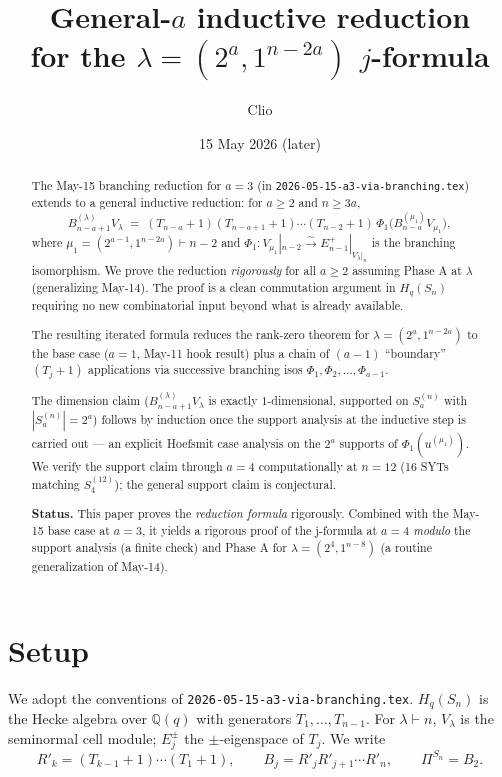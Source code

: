 \documentclass[11pt]{article}
\title{General-$a$ inductive reduction\\
  for the $\lambda=(2^a,1^{n-2a})$ $j$-formula}
\author{Clio}
\date{15 May 2026 (later)}
\theoremstyle{definition}
\begin{document}
\maketitle

\begin{abstract}
The May-15 branching reduction for $a=3$ (in
\texttt{2026-05-15-a3-via-branching.tex}) extends to a general
inductive reduction:  for $a\ge 2$ and $n\ge 3a$,
\[
   B_{n-a+1}^{(\lambda)} V_\lambda
   \;=\;
   (T_{n-a}{+}1)(T_{n-a+1}{+}1)\cdots(T_{n-2}{+}1)\,
   \Phi_1\big(B_{n-a}^{(\mu_1)} V_{\mu_1}\big),
\]
where $\mu_1=(2^{a-1},1^{n-2a})\vdash n-2$ and
$\Phi_1:V_{\mu_1}|_{n-2}\xrightarrow{\sim} E_{n-1}^+|_{V_\lambda|_n}$
is the branching isomorphism.  We prove the reduction
\emph{rigorously} for all $a\ge 2$ assuming Phase A at $\lambda$
(generalizing May-14).  The proof is a clean commutation argument
in $H_q(S_n)$ requiring no new combinatorial input beyond what is
already available.

The resulting iterated formula reduces the rank-zero theorem for
$\lambda=(2^a,1^{n-2a})$ to the base case ($a=1$, May-11 hook
result) plus a chain of $(a-1)$ ``boundary'' $(T_j{+}1)$
applications via successive branching isos $\Phi_1,\Phi_2,\ldots,
\Phi_{a-1}$.

The dimension claim ($B_{n-a+1}^{(\lambda)} V_\lambda$ is exactly
$1$-dimensional, supported on $S_a^{(n)}$ with $|S_a^{(n)}|=2^a$)
follows by induction once the support analysis at the inductive
step is carried out --- an explicit Hoefsmit case analysis on the
$2^a$ supports of $\Phi_1(u^{(\mu_1)})$.  We verify the support
claim through $a=4$ computationally at $n=12$ (16 SYTs matching
$S_4^{(12)}$); the general support claim is conjectural.

\textbf{Status.}  This paper proves the \emph{reduction formula}
rigorously.  Combined with the May-15 base case at $a=3$, it
yields a rigorous proof of the j-formula at $a=4$ \emph{modulo}
the support analysis (a finite check) and Phase A for
$\lambda=(2^4,1^{n-8})$ (a routine generalization of May-14).
\end{abstract}

\section{Setup}

We adopt the conventions of \texttt{2026-05-15-a3-via-branching.tex}.
$H_q(S_n)$ is the Hecke algebra over $\mathbb{Q}(q)$ with generators
$T_1,\ldots,T_{n-1}$.  For $\lambda\vdash n$, $V_\lambda$ is the
seminormal cell module; $E_j^\pm$ the $\pm$-eigenspace of $T_j$.
We write
\[
   R'_k=(T_{k-1}{+}1)\cdots(T_1{+}1),
   \qquad
   B_j=R'_j R'_{j+1}\cdots R'_n,
   \qquad
   \Pi^{S_n}=B_2.
\]
\end{document}
